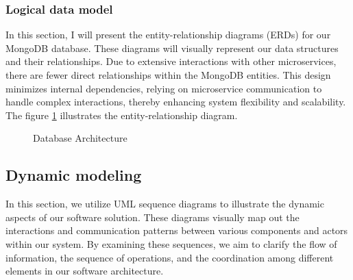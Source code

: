 \subsubsection{Logical data model}
In this section, I will present the entity-relationship diagrams (ERDs) for our MongoDB database. These diagrams will visually represent our data structures and their relationships. Due to extensive interactions with other microservices, there are fewer direct relationships within the MongoDB entities. This design minimizes internal dependencies, relying on microservice communication to handle complex interactions, thereby enhancing system flexibility and scalability.
\noindent The figure \ref{fig:database-architecture} illustrates the entity-relationship diagram.

\begin{figure}[H]
    \centering
    \caption{Database Architecture}
    \label{fig:database-architecture}
\end{figure}

\subsection{Dynamic modeling}
In this section, we utilize UML sequence diagrams to illustrate the dynamic aspects of our software solution. These diagrams visually map out the interactions and communication patterns between various components and actors within our system. By examining these sequences, we aim to clarify the flow of information, the sequence of operations, and the coordination among different elements in our software architecture.
